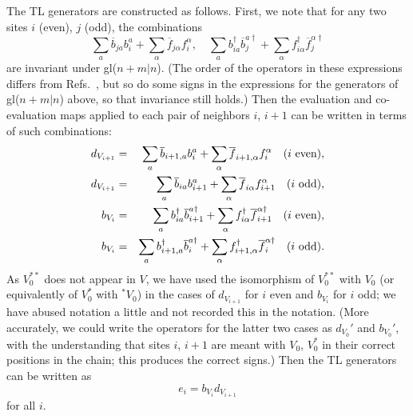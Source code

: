\documentclass[twocolumn,floats,pra]{revtex4}
\newcommand {\be}{\begin{equation}}
\newcommand {\ee} {\end{equation}}
\newcommand {\bea}{\begin{eqnarray}}
\newcommand {\eea} {\end{eqnarray}}
\begin{document}
The TL generators are constructed as follows. First, we note that
for any two sites $i$ (even), $j$ (odd), the combinations
\begin{equation}
\sum_a  \overline{b}_{ja} b_i^a + \sum_\alpha
\overline{f}_{j\alpha}f_i^\alpha,\quad
\sum_ab_{ia}^\dagger\overline{b}_j^{a\dagger} + \sum_\alpha
f_{i\alpha}^\dagger\overline{f}_j^{\alpha\dagger}
\end{equation} %
are invariant under gl($n+m|n$). (The order of the operators in
these expressions differs from Refs.\ \cite{rs,fr}, but so do some
signs in the expressions for the generators of gl($n+m|n$) above,
so that invariance still holds.) Then the evaluation and
co-evaluation maps applied to each pair of neighbors $i$, $i+1$
can be written in terms of such combinations:%
\bea%
d_{V_{i+1}}&=&\sum_a \overline{b}_{i+1,a}b_i^a  + \sum_\alpha
\overline{f}_{i+1,\alpha}f_i^\alpha\quad (i\hbox{ even}),\\
d_{V_{i+1}}&=&\sum_a \overline{b}_{ia}b_{i+1}^a  + \sum_\alpha
\overline{f}_{i\alpha}f_{i+1}^\alpha\quad (i\hbox{ odd}),\\
b_{V_i}&=&\sum_ab_{ia}^\dagger\overline{b}_{i+1}^{a\dagger} +
\sum_\alpha
f_{i\alpha}^\dagger\overline{f}_{i+1}^{\alpha\dagger}\quad
(i\hbox{ even}),\\
b_{V_i}&=&\sum_ab_{i+1,a}^\dagger\overline{b}_i^{a\dagger} +
\sum_\alpha
f_{i+1,\alpha}^\dagger\overline{f}_i^{\alpha\dagger}\quad (i\hbox{
odd}).
 \eea
As $V_0^{**}$ does not appear in $V$, we have used the isomorphism
of $V_0^{**}$ with $V_0$ (or equivalently of $V_0^*$ with $^*V_0$)
in the cases of $d_{V_{i+1}}$ for $i$ even and $b_{V_i}$ for $i$
odd; we have abused notation a little and not recorded this in the
notation. (More accurately, we could write the operators for the
latter two cases as $d_{V_0}'$ and $b_{V_0}'$, with the
understanding that sites $i$, $i+1$ are meant with $V_0$, $V_0^*$
in their correct positions in the chain; this produces the correct
signs.) Then the TL generators can be written
as%
\be%
e_i=b_{V_i}d_{V_{i+1}}\ee for all $i$.
\end{document}
